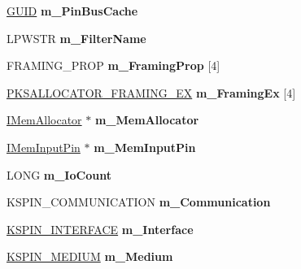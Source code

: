\begin{DoxyCompactItemize}
\hyperlink{interface_g_u_i_d}{G\+U\+ID} {\bfseries m\+\_\+\+Pin\+Bus\+Cache}
\item 
\mbox{\label{class_c_output_pin_a8792cbafc8cde818462712fd51d5416b}} 
L\+P\+W\+S\+TR {\bfseries m\+\_\+\+Filter\+Name}
\item 
\mbox{\label{class_c_output_pin_a6b9206b7566296bb0a1bae45d1549fd1}} 
F\+R\+A\+M\+I\+N\+G\+\_\+\+P\+R\+OP {\bfseries m\+\_\+\+Framing\+Prop} \mbox{[}4\mbox{]}
\item 
\mbox{\label{class_c_output_pin_a4ee986261749686ab58485ad9d7cb2ba}} 
\hyperlink{struct_k_s_a_l_l_o_c_a_t_o_r___f_r_a_m_i_n_g___e_x}{P\+K\+S\+A\+L\+L\+O\+C\+A\+T\+O\+R\+\_\+\+F\+R\+A\+M\+I\+N\+G\+\_\+\+EX} {\bfseries m\+\_\+\+Framing\+Ex} \mbox{[}4\mbox{]}
\item 
\mbox{\label{class_c_output_pin_aa7b82f032c40d86416b2d8e3839dda19}} 
\hyperlink{interface_i_mem_allocator}{I\+Mem\+Allocator} $\ast$ {\bfseries m\+\_\+\+Mem\+Allocator}
\item 
\mbox{\label{class_c_output_pin_a9d91dea77f836172c776939774f023b9}} 
\hyperlink{interface_i_mem_input_pin}{I\+Mem\+Input\+Pin} $\ast$ {\bfseries m\+\_\+\+Mem\+Input\+Pin}
\item 
\mbox{\label{class_c_output_pin_abb518eaa92b394bf8c4618296d973f59}} 
L\+O\+NG {\bfseries m\+\_\+\+Io\+Count}
\item 
\mbox{\label{class_c_output_pin_aee1e984fe38eb6cfb2a2df468f51388f}} 
K\+S\+P\+I\+N\+\_\+\+C\+O\+M\+M\+U\+N\+I\+C\+A\+T\+I\+ON {\bfseries m\+\_\+\+Communication}
\item 
\mbox{\label{class_c_output_pin_a2f7371102cc0ce46af1c9a274e15653d}} 
\hyperlink{struct_k_s_i_d_e_n_t_i_f_i_e_r}{K\+S\+P\+I\+N\+\_\+\+I\+N\+T\+E\+R\+F\+A\+CE} {\bfseries m\+\_\+\+Interface}
\item 
\mbox{\label{class_c_output_pin_a33f0ee1091b07eebc959232a5c3b50e3}} 
\hyperlink{struct_k_s_i_d_e_n_t_i_f_i_e_r}{K\+S\+P\+I\+N\+\_\+\+M\+E\+D\+I\+UM} {\bfseries m\+\_\+\+Medium}

\end{DoxyCompactItemize}
